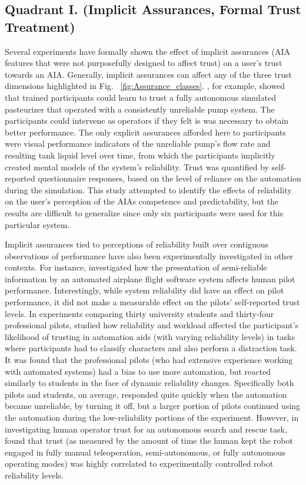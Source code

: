 \subsection{Quadrant I. (Implicit Assurances, Formal Trust Treatment)}\label{sec:q1}

Several experiments have formally shown the effect of implicit assurances (AIA features that were not purposefully designed to affect trust) on a user's trust towards an AIA. Generally, implicit assurances can affect any of the three trust dimensions highlighted in Fig. ~\ref{fig:Assurance_classes}. \citet{Muir1996-gt}, for example, showed that trained participants could learn to trust a fully autonomous simulated pasteurizer that operated with a consistently unreliable pump system. The participants could intervene as operators if they felt is was necessary to obtain better performance. The only explicit assurances afforded here to participants were visual performance indicators of the unreliable pump's flow rate and resulting tank liquid level over time, from which the participants implicitly created mental models of the system's reliability. 
Trust was quantified by self-reported questionnaire responses, based on the level of reliance on the automation during the simulation. 
This study attempted to identify the effects of reliability on the user's perception of the AIAs competence and predictability, but the results are difficult to generalize since only six participants were used for this particular system. 

Implicit assurances tied to perceptions of reliability built over contiguous observations of performance have also been experimentally investigated in other contexts. For instance, \citet{Wickens1999-la} investigated how the presentation of semi-reliable information by an automated airplane flight software system affects human pilot performance. Interestingly, while system reliability did have an effect on pilot performance, it did not make a measurable effect on the pilots' self-reported trust levels. In experiments comparing thirty university students and thirty-four professional pilots, \citet{Riley1996-qm} studied how reliability and workload affected the participant's likelihood of trusting in automation aids (with varying reliability levels) in tasks where participants had to classify characters and also perform a distraction task. It was found that the professional pilots (who had extensive experience working with automated systems) had a bias to use more automation, but reacted similarly to students in the face of dynamic reliability changes. Specifically both pilots and students, on average, responded quite quickly when the automation became unreliable, by turning it off, but a larger portion of pilots continued using the automation during the low-reliability portions of the experiment. However, in investigating human operator trust for an autonomous search and rescue task, \citet{Desai2012-rc} found that trust (as measured by the amount of time the human kept the robot engaged in fully manual teleoperation, semi-autonomous, or fully autonomous operating modes) was highly correlated to experimentally controlled robot reliability levels. 

